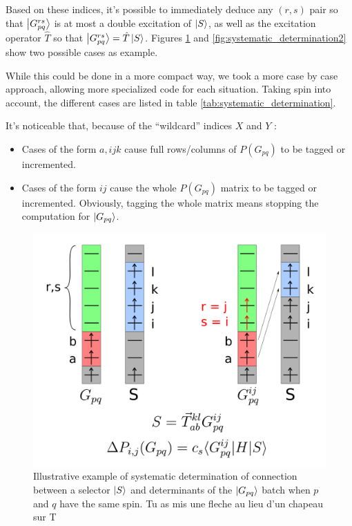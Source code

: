 \documentclass[./thesis.tex]{subfiles}
\begin{document}
Based on these indices, it's possible to immediately deduce any $(r,s)$ pair so that $\ket {G_{pq}^{rs}}$ is at most a double excitation of $\ket S$, as well as the excitation operator $\hat{T}$ so that $\ket {G_{pq}^{rs}}=\hat{T} \ket S$. Figures \ref{fig:systematic_determination} and \ref{fig:systematic_determination2} show two possible cases as example.

While this could be done in a more compact way, we took a more case by case approach, allowing more specialized code for each situation. Taking spin into account, the different cases are listed in table \ref{tab:systematic_determination}.


It's noticeable that, because of the ``wildcard'' indices $X$ and $Y$ :
\begin{itemize}

\item
Cases of the form $a,ijk$ cause full rows/columns of $P(G_{pq})$ to be tagged or incremented.
\item
Cases of the form $ij$ cause the whole $P(G_{pq})$ matrix to be tagged or incremented. Obviously, tagging the whole matrix means stopping the computation for $\ket {G_{pq}}$.
\end{itemize}

\begin{figure}[h!]
	\begin{center}
		\includegraphics[width=0.70\columnwidth]{figures/cipsi/systematic_determination}
		\caption{Illustrative example of systematic determination of connection between a selector $\ket S$ and determinants of the $\ket {G_{pq}}$ batch when $p$ and $q$ have the same spin.
\alert{ Tu as mis une fleche au lieu d'un chapeau sur T}
}
		\label{fig:systematic_determination}
	\end{center}
	
\end{figure}
\end{document}
